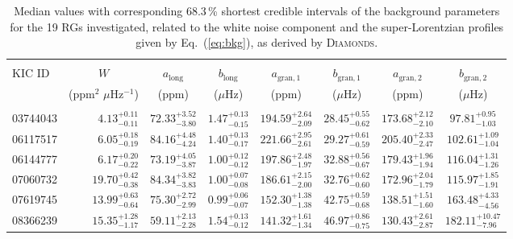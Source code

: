 \documentclass[structabstract]{aa}
\newcommand{\muhz}{$\mu$Hz}
\newcommand{\diamonds}{\textsc{D\large{iamonds}}}
\begin{document}


\begin{table*}
\caption{Median values with corresponding 68.3\,\% shortest credible intervals of the background parameters for the 19 RGs investigated, related to the white noise component and the super-Lorentzian profiles given by Eq.~(\ref{eq:bkg}), as derived by \diamonds.}             %
\centering                         
\begin{tabular}{l r r c c c c c}       
\hline\hline
\\[-8pt]         
KIC ID & \multicolumn{1}{c}{$W$} & \multicolumn{1}{c}{$a_\mathrm{long}$} & $b_\mathrm{long}$ & $a_\mathrm{gran,1}$ & $b_\mathrm{gran,1}$ & $a_\mathrm{gran,2}$ & $b_\mathrm{gran,2}$\\ [1pt]
 & \multicolumn{1}{c}{(ppm$^2$ $\mu$Hz$^{-1}$)} & \multicolumn{1}{c}{(ppm)}  & (\muhz) & (ppm) & (\muhz) & (ppm) & (\muhz)\\ [1pt]   
\hline
\\[-8pt]
03744043         & $4.13_{-0.11}^{+0.11}$   &   $72.33_{-3.80}^{+3.52}$   &   $1.47_{-0.15}^{+0.13}$   &   $194.59_{-2.09}^{+2.64}$   &   $28.45_{-0.62}^{+0.55}$   &   $173.68_{-2.10}^{+2.12}$   &   $97.81_{-1.03}^{+0.95}$ \\[1pt]
06117517         & $6.05_{-0.19}^{+0.18}$   &   $84.16_{-4.24}^{+4.48}$   &   $1.40_{-0.17}^{+0.13}$   &   $221.66_{-2.61}^{+2.95}$   &   $29.27_{-0.59}^{+0.61}$   &   $205.40_{-2.47}^{+2.33}$   &   $102.61_{-1.04}^{+1.09}$ \\[1pt]
06144777         & $6.17_{-0.22}^{+0.20}$   &   $73.19_{-3.87}^{+4.05}$   &   $1.00_{-0.12}^{+0.12}$   &   $197.86_{-1.97}^{+2.48}$   &   $32.88_{-0.67}^{+0.56}$   &   $179.43_{-1.94}^{+1.96}$   &   $116.04_{-1.26}^{+1.31}$ \\[1pt]
07060732         & $19.70_{-0.38}^{+0.42}$   &   $84.34_{-3.83}^{+3.82}$   &   $1.00_{-0.08}^{+0.07}$   &   $186.61_{-2.00}^{+2.15}$   &   $32.76_{-0.60}^{+0.62}$   &   $172.96_{-1.79}^{+2.04}$   &   $115.97_{-1.91}^{+1.85}$ \\[1pt]
07619745         & $13.99_{-0.64}^{+0.63}$   &   $75.30_{-2.99}^{+2.72}$   &   $0.99_{-0.07}^{+0.06}$   &   $152.30_{-1.38}^{+1.38}$   &   $42.75_{-0.68}^{+0.59}$   &   $138.51_{-1.60}^{+1.51}$   &   $163.48_{-4.56}^{+4.33}$ \\[1pt]
08366239         & $15.35_{-1.17}^{+1.28}$   &   $59.11_{-2.28}^{+2.13}$   &   $1.54_{-0.12}^{+0.13}$   &   $141.32_{-1.34}^{+1.61}$   &   $46.97_{-0.75}^{+0.86}$   &   $130.43_{-2.87}^{+2.61}$   &   $182.11_{-7.96}^{+10.47}$ \\[1pt]

\end{tabular}
\end{table*}
\end{document}
